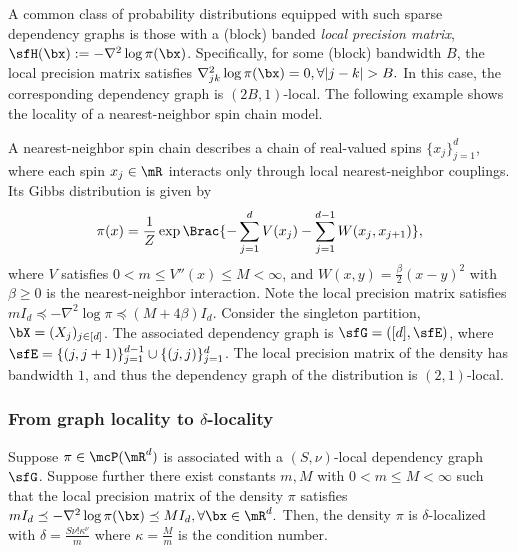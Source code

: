 \documentclass[11pt]{article}
\begin{document}
A common class of probability distributions equipped with such sparse dependency graphs is those with a (block) banded \emph{local precision matrix}, $\sfH(\bx) := -\nabla^2 \log \pi(\bx)$. Specifically, for some (block) bandwidth $B$, the local precision matrix satisfies
\(
    \nabla^2_{jk} \log \pi(\bx) = 0, \forall |j-k| > B.
\)
In this case, the corresponding dependency graph is $(2B,1)$-local. The following example shows the locality of a nearest-neighbor spin chain model.


\begin{exmp}
A nearest-neighbor spin chain describes a chain of real-valued spins $\{x_j\}_{j=1}^{d}$, where each spin $x_j \in \mR$ interacts only through local nearest-neighbor couplings. Its Gibbs distribution is given by
\begin{equation}
    \pi(x) = \frac{1}{Z} \exp \Brac{ - \sum_{j=1}^{d} V(x_j) - \sum_{j=1}^{d-1} W(x_j,x_{j+1}) },
\end{equation}
where $V$ satisfies $0<m\le V''(x)\le M<\infty$, and $W(x,y) = \frac{\beta}{2} (x-y)^2$ with $\beta\ge0$ is the nearest-neighbor interaction.
Note the local precision matrix satisfies $mI_d\preceq-\nabla^2\log\pi\preceq(M+4\beta)I_d$. Consider the singleton partition, $\bX = (X_j)_{j \in [d]}$. The associated dependency graph is $\sfG = ([d], \sfE)$, where $\sfE = \{(j,j+1)\}_{j = 1}^{d-1} \cup \{(j,j)\}_{j = 1}^d$. The local precision matrix of the density has bandwidth $1$, and thus the dependency graph of the distribution is $(2,1)$-local.
\end{exmp}




\subsubsection{From graph locality to \texorpdfstring{$\delta$}{delta}-locality}
\label{sec:graph_to_loc}

\begin{thm}
\label{thm:MRF_loc}
Suppose $\pi \in \mcP(\mR^d)$ is associated with a $(S,\nu)$-local dependency graph $\sfG$. Suppose further there exist constants $m,M$ with $0<m\le M<\infty$ such that the local precision matrix of the density $\pi$ satisfies
\(
    m I_d \preceq - \nabla^2 \log \pi(\bx) \preceq M I_d, \forall \bx \in \mR^d.
\)
Then, the density $\pi$ is $\delta$-localized with $\delta = \frac{S \nu! \kappa^\nu }{m}$ where $\kappa = \frac{M}{m}$ is the condition number. 
\end{thm}
\end{document}
